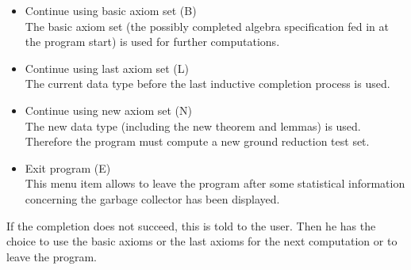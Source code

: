 \begin{itemize}
\item Continue using basic axiom set (B)\\
The basic axiom set (the possibly completed algebra specification fed
in at the program start) is used for further computations.
\item Continue using last axiom set (L)\\
The current data type before the last inductive completion process is used.
\item Continue using new axiom set (N)\\
The new data type (including the new theorem and lemmas) is used. Therefore the 
program must compute a new ground reduction test set.
\item Exit program (E)\\
This menu item allows to leave the program after some statistical 
information concerning the garbage collector has been displayed.
\end{itemize}
 
If the completion does not succeed, this is told to the user.
Then he has the choice to use the basic axioms or the last axioms for the
next computation or to leave the program.
